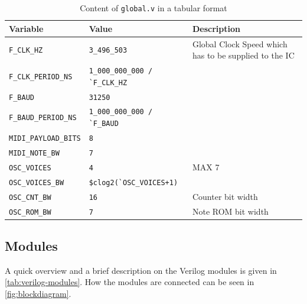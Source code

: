 \begin{table}[ht]
	\caption{Content of \texttt{global.v} in a tabular format}\label{tab:global.v}
	\begin{tabularx}{\textwidth}{llX}
		\toprule
		Variable                      & Value                                 & Description                                           \\ \midrule
		\lstinline!F_CLK_HZ!          & \lstinline!3_496_503!                 & Global Clock Speed which has to be supplied to the IC \\
		\lstinline!F_CLK_PERIOD_NS!   & \lstinline!1_000_000_000 / `F_CLK_HZ! &                                                       \\
		\lstinline!F_BAUD!            & \lstinline!31250!                     &                                                       \\
		\lstinline!F_BAUD_PERIOD_NS!  & \lstinline!1_000_000_000 / `F_BAUD!   &                                                       \\
		\lstinline!MIDI_PAYLOAD_BITS! & \lstinline!8!                         &                                                       \\
		\lstinline!MIDI_NOTE_BW!      & \lstinline!7!                         &                                                       \\
		\lstinline!OSC_VOICES!        & \lstinline!4!                         & MAX 7                                                 \\
		\lstinline!OSC_VOICES_BW!     & \lstinline!$clog2(`OSC_VOICES+1)!     &                                                       \\
		\lstinline!OSC_CNT_BW!        & \lstinline!16!                        & Counter bit width                                     \\
		\lstinline!OSC_ROM_BW!        & \lstinline!7!                         & Note ROM bit width                                    \\
		\bottomrule
	\end{tabularx}
\end{table}

\subsection{Modules}

A quick overview and a brief description on the Verilog modules is given in \autoref{tab:verilog-modules}. How the modules are connected can be seen in \autoref{fig:blockdiagram}.

